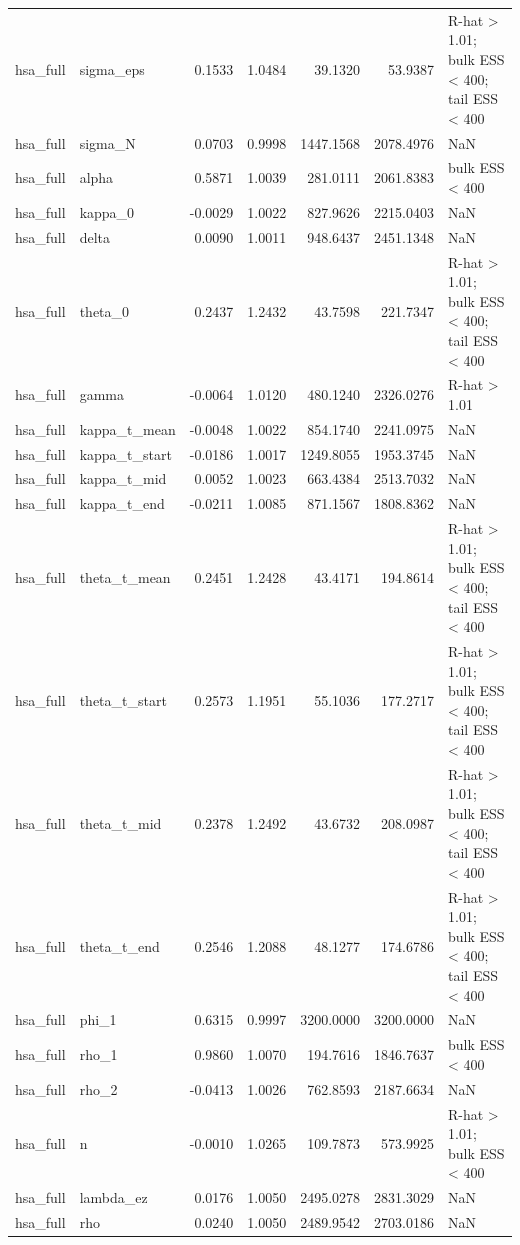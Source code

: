\begin{tabular}{llrrrrl}
hsa\_full & sigma\_eps & 0.1533 & 1.0484 & 39.1320 & 53.9387 & R-hat > 1.01; bulk ESS < 400; tail ESS < 400 \\
hsa\_full & sigma\_N & 0.0703 & 0.9998 & 1447.1568 & 2078.4976 & NaN \\
hsa\_full & alpha & 0.5871 & 1.0039 & 281.0111 & 2061.8383 & bulk ESS < 400 \\
hsa\_full & kappa\_0 & -0.0029 & 1.0022 & 827.9626 & 2215.0403 & NaN \\
hsa\_full & delta & 0.0090 & 1.0011 & 948.6437 & 2451.1348 & NaN \\
hsa\_full & theta\_0 & 0.2437 & 1.2432 & 43.7598 & 221.7347 & R-hat > 1.01; bulk ESS < 400; tail ESS < 400 \\
hsa\_full & gamma & -0.0064 & 1.0120 & 480.1240 & 2326.0276 & R-hat > 1.01 \\
hsa\_full & kappa\_t\_mean & -0.0048 & 1.0022 & 854.1740 & 2241.0975 & NaN \\
hsa\_full & kappa\_t\_start & -0.0186 & 1.0017 & 1249.8055 & 1953.3745 & NaN \\
hsa\_full & kappa\_t\_mid & 0.0052 & 1.0023 & 663.4384 & 2513.7032 & NaN \\
hsa\_full & kappa\_t\_end & -0.0211 & 1.0085 & 871.1567 & 1808.8362 & NaN \\
hsa\_full & theta\_t\_mean & 0.2451 & 1.2428 & 43.4171 & 194.8614 & R-hat > 1.01; bulk ESS < 400; tail ESS < 400 \\
hsa\_full & theta\_t\_start & 0.2573 & 1.1951 & 55.1036 & 177.2717 & R-hat > 1.01; bulk ESS < 400; tail ESS < 400 \\
hsa\_full & theta\_t\_mid & 0.2378 & 1.2492 & 43.6732 & 208.0987 & R-hat > 1.01; bulk ESS < 400; tail ESS < 400 \\
hsa\_full & theta\_t\_end & 0.2546 & 1.2088 & 48.1277 & 174.6786 & R-hat > 1.01; bulk ESS < 400; tail ESS < 400 \\
hsa\_full & phi\_1 & 0.6315 & 0.9997 & 3200.0000 & 3200.0000 & NaN \\
hsa\_full & rho\_1 & 0.9860 & 1.0070 & 194.7616 & 1846.7637 & bulk ESS < 400 \\
hsa\_full & rho\_2 & -0.0413 & 1.0026 & 762.8593 & 2187.6634 & NaN \\
hsa\_full & n & -0.0010 & 1.0265 & 109.7873 & 573.9925 & R-hat > 1.01; bulk ESS < 400 \\
hsa\_full & lambda\_ez & 0.0176 & 1.0050 & 2495.0278 & 2831.3029 & NaN \\
hsa\_full & rho & 0.0240 & 1.0050 & 2489.9542 & 2703.0186 & NaN \\

\end{tabular}
